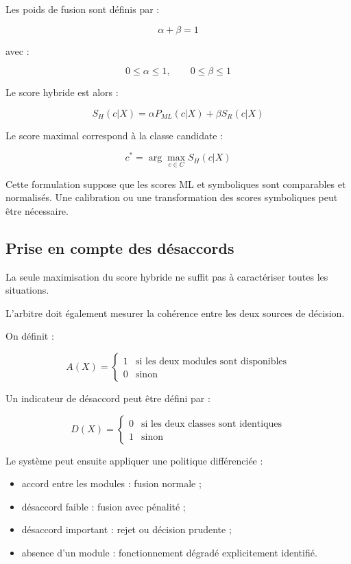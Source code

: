 Les poids de fusion sont définis par :

\[
\alpha+\beta=1
\]

avec :

\[
0\leq\alpha\leq1,\qquad
0\leq\beta\leq1
\]

Le score hybride est alors :

\[
S_H(c|X)=
\alpha P_{ML}(c|X)
+
\beta S_R(c|X)
\]

Le score maximal correspond à la classe candidate :

\[
c^*=\arg\max_{c\in C}S_H(c|X)
\]

Cette formulation suppose que les scores ML et symboliques
sont comparables et normalisés. Une calibration ou une
transformation des scores symboliques peut être nécessaire.

\subsection{Prise en compte des désaccords}

La seule maximisation du score hybride ne suffit pas
à caractériser toutes les situations.

L'arbitre doit également mesurer la cohérence
entre les deux sources de décision.

On définit :

\[
A(X)=
\begin{cases}
1 & \text{si les deux modules sont disponibles}\\
0 & \text{sinon}
\end{cases}
\]

Un indicateur de désaccord peut être défini par :

\[
D(X)=
\begin{cases}
0 & \text{si les deux classes sont identiques}\\
1 & \text{sinon}
\end{cases}
\]

Le système peut ensuite appliquer une politique
différenciée :

\begin{itemize}
    \item accord entre les modules : fusion normale ;
    \item désaccord faible : fusion avec pénalité ;
    \item désaccord important : rejet ou décision prudente ;
    \item absence d'un module : fonctionnement dégradé
    explicitement identifié.
\end{itemize}

